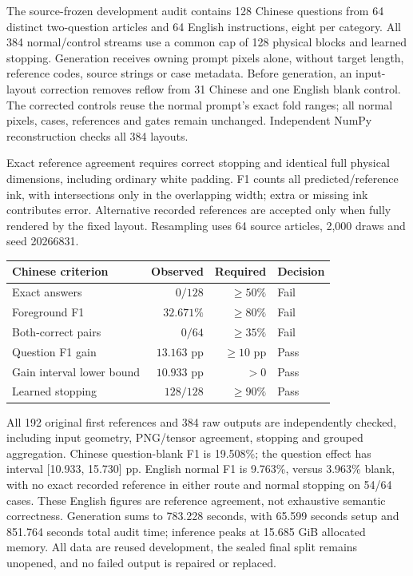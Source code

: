 \documentclass[10pt,a4paper]{article}
\newcommand{\CodecLanguageFOne}{32.671}
\newcommand{\CodecLanguageBlankFOne}{19.508}
\newcommand{\CodecLanguageQuestionGain}{13.163}
\newcommand{\CodecLanguageCILow}{10.933}
\newcommand{\CodecLanguageCIHigh}{15.730}
\begin{document}
The source-frozen development audit contains 128 Chinese questions from
64 distinct two-question articles and 64 English instructions, eight per
category. All 384 normal/control streams use a common cap of 128 physical
blocks and learned stopping. Generation receives owning prompt pixels alone,
without target length, reference codes, source strings or case metadata.
Before generation, an input-layout correction removes reflow from 31 Chinese
and one English blank control. The corrected controls reuse the normal
prompt's exact fold ranges; all normal pixels, cases, references and gates
remain unchanged. Independent NumPy reconstruction checks all 384 layouts.

Exact reference agreement requires correct stopping and identical full
physical dimensions, including ordinary white padding. F1 counts all
predicted/reference ink, with intersections only in the overlapping width;
extra or missing ink contributes error. Alternative recorded references are
accepted only when fully rendered by the fixed layout. Resampling uses
64 source articles, 2,000 draws and seed 20266831.

\begin{center}\small
\begin{tabular}{lrrl}
\toprule
Chinese criterion & Observed & Required & Decision\\
\midrule
Exact answers & $0/128$ & $\geq50\%$ & Fail\\
Foreground F1 & $\CodecLanguageFOne\%$ & $\geq80\%$ & Fail\\
Both-correct pairs & $0/64$ & $\geq35\%$ & Fail\\
Question F1 gain & $\CodecLanguageQuestionGain$ pp & $\geq10$ pp & Pass\\
Gain interval lower bound & $\CodecLanguageCILow$ pp & $>0$ & Pass\\
Learned stopping & $128/128$ & $\geq90\%$ & Pass\\
\bottomrule
\end{tabular}
\end{center}

All 192 original first references and 384 raw outputs are independently
checked, including input geometry, PNG/tensor agreement, stopping and grouped
aggregation. Chinese question-blank F1 is \CodecLanguageBlankFOne\%; the
question effect has interval [\CodecLanguageCILow, \CodecLanguageCIHigh] pp.
English normal F1 is 9.763\%, versus 3.963\% blank, with no exact recorded
reference in either route and normal stopping on 54/64 cases. These English
figures are reference agreement, not exhaustive semantic correctness.
Generation sums to 783.228 seconds, with 65.599 seconds setup and 851.764
seconds total audit time; inference peaks at 15.685 GiB allocated memory.
All data are reused development, the sealed final split remains unopened,
and no failed output is repaired or replaced.
\end{document}
